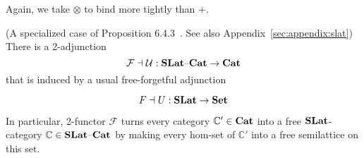 Again, we take $\otimes$ to bind more tightly than $+$.


\begin{proposition}(A specialized case of Proposition 6.4.3~\cite{Borceux_1994}. See also Appendix~\ref{sec:appendix:slat})
There is a 2-adjunction 
\vspace{-1mm}
\[
\mathcal{F} \dashv \mathcal{U} : \catname{SLat}\text{--}\catname{Cat} \to \catname{Cat}
\vspace{-1mm}
\]
that is induced by a usual free-forgetful adjunction 

\vspace{-1mm}
\[
F \dashv U : \catname{SLat} \to \catname{Set}
\vspace{-1mm}
\]
\end{proposition}
In particular, 2-functor $\mathcal{F}$ turns every category $\mathbb{C'} \in \mathbf{Cat}$ into a free $\mathbf{SLat}$-category $\mathbb{C} \in \mathbf{SLat}\text{--}\mathbf{Cat}$ by making every hom-set of $\mathbb{C'}$ into a free semilattice on this set.
